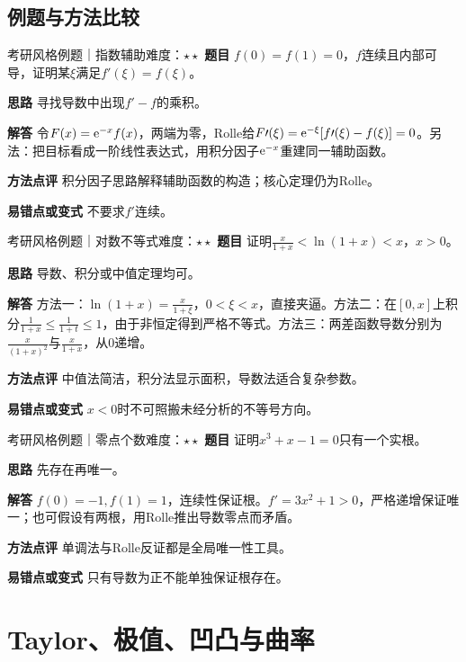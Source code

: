 \subsection{例题与方法比较}
\begin{example}{考研风格例题｜指数辅助}{难度：$\star\star$}
\label{ex:2:7}\textbf{题目} $f(0)=f(1)=0$，$f$连续且内部可导，证明某$\xi$满足$f\prime(\xi)=f(\xi)$。\par
\textbf{思路} 寻找导数中出现$f\prime-f$的乘积。\par
\textbf{解答} 令$F(x)=\mathrm{e}^{-x}f(x)$，两端为零，Rolle给$F\prime(\xi)=\mathrm{e}^{-\xi}[f\prime(\xi)-f(\xi)]=0$。另法：把目标看成一阶线性表达式，用积分因子$\mathrm{e}^{-x}$重建同一辅助函数。\par
\textbf{方法点评} 积分因子思路解释辅助函数的构造；核心定理仍为Rolle。\par
\textbf{易错点或变式} 不要求$f\prime$连续。
\end{example}
\begin{example}{考研风格例题｜对数不等式}{难度：$\star\star$}
\label{ex:2:8}\textbf{题目} 证明$\frac{x}{1+x}<\ln(1+x)<x$，$x>0$。\par
\textbf{思路} 导数、积分或中值定理均可。\par
\textbf{解答} 方法一：$\ln(1+x)=\frac{x}{1+\xi}$，$0<\xi<x$，直接夹逼。方法二：在$[0,x]$上积分$\frac{1}{1+x}\le\frac{1}{1+t}\le1$，由于非恒定得到严格不等式。方法三：两差函数导数分别为$\frac{x}{(1+x)^2}$与$\frac{x}{1+x}$，从0递增。\par
\textbf{方法点评} 中值法简洁，积分法显示面积，导数法适合复杂参数。\par
\textbf{易错点或变式} $x<0$时不可照搬未经分析的不等号方向。
\end{example}
\begin{example}{考研风格例题｜零点个数}{难度：$\star\star$}
\label{ex:2:9}\textbf{题目} 证明$x^3+x-1=0$只有一个实根。\par
\textbf{思路} 先存在再唯一。\par
\textbf{解答} $f(0)=-1,f(1)=1$，连续性保证根。$f\prime=3x^2+1>0$，严格递增保证唯一；也可假设有两根，用Rolle推出导数零点而矛盾。\par
\textbf{方法点评} 单调法与Rolle反证都是全局唯一性工具。\par
\textbf{易错点或变式} 只有导数为正不能单独保证根存在。
\end{example}
\section{Taylor、极值、凹凸与曲率}\label{sec:2:4}
